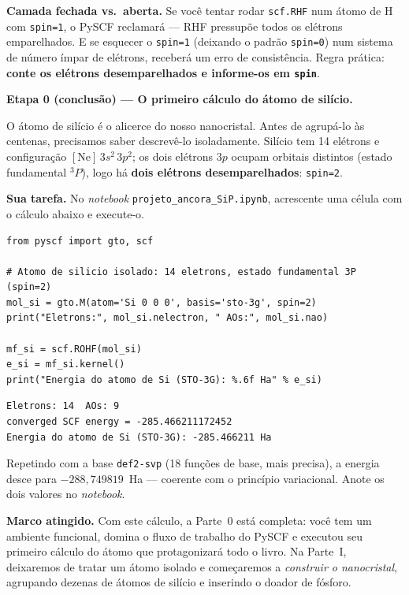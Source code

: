 \documentclass[11pt,a4paper,openany]{book}
\newcommand{\code}[1]{\texttt{#1}}
\newcommand{\pyscf}{\textsf{PySCF}}
\begin{document}
\begin{caixaatencao}
\textbf{Camada fechada vs.\ aberta.} Se você tentar rodar \code{scf.RHF} num átomo
de H com \code{spin=1}, o \pyscf{} reclamará --- RHF pressupõe todos os elétrons
emparelhados. E se esquecer o \code{spin=1} (deixando o padrão \code{spin=0}) num
sistema de número ímpar de elétrons, receberá um erro de consistência. Regra
prática: \textbf{conte os elétrons desemparelhados e informe-os em \code{spin}}.
\end{caixaatencao}

\begin{caixaancora}
\textbf{Etapa 0 (conclusão) --- O primeiro cálculo do átomo de silício.}

O átomo de silício é o alicerce do nosso nanocristal. Antes de agrupá-lo às
centenas, precisamos saber descrevê-lo isoladamente. Silício tem 14 elétrons e
configuração $[\mathrm{Ne}]\,3s^2\,3p^2$; os dois elétrons $3p$ ocupam orbitais
distintos (estado fundamental $^3P$), logo há \textbf{dois elétrons
desemparelhados}: \code{spin=2}.

\vspace{0.3cm}
\textbf{Sua tarefa.} No \emph{notebook} \code{projeto\_ancora\_SiP.ipynb},
acrescente uma célula com o cálculo abaixo e execute-o.

\begin{lstlisting}[style=python]
from pyscf import gto, scf

# Atomo de silicio isolado: 14 eletrons, estado fundamental 3P (spin=2)
mol_si = gto.M(atom='Si 0 0 0', basis='sto-3g', spin=2)
print("Eletrons:", mol_si.nelectron, " AOs:", mol_si.nao)

mf_si = scf.ROHF(mol_si)
e_si = mf_si.kernel()
print("Energia do atomo de Si (STO-3G): %.6f Ha" % e_si)
\end{lstlisting}

\begin{lstlisting}[style=console]
Eletrons: 14  AOs: 9
converged SCF energy = -285.466211172452
Energia do atomo de Si (STO-3G): -285.466211 Ha
\end{lstlisting}

Repetindo com a base \code{def2-svp} (18 funções de base, mais precisa), a energia
desce para $-288{,}749819$~Ha --- coerente com o princípio variacional. Anote os
dois valores no \emph{notebook}.

\vspace{0.3cm}
\textbf{Marco atingido.} Com este cálculo, a Parte~0 está completa: você tem um
ambiente funcional, domina o fluxo de trabalho do \pyscf{} e executou seu primeiro
cálculo do átomo que protagonizará todo o livro. Na Parte~I, deixaremos de tratar
um átomo isolado e começaremos a \emph{construir o nanocristal}, agrupando dezenas
de átomos de silício e inserindo o doador de fósforo.
\end{caixaancora}
\end{document}
